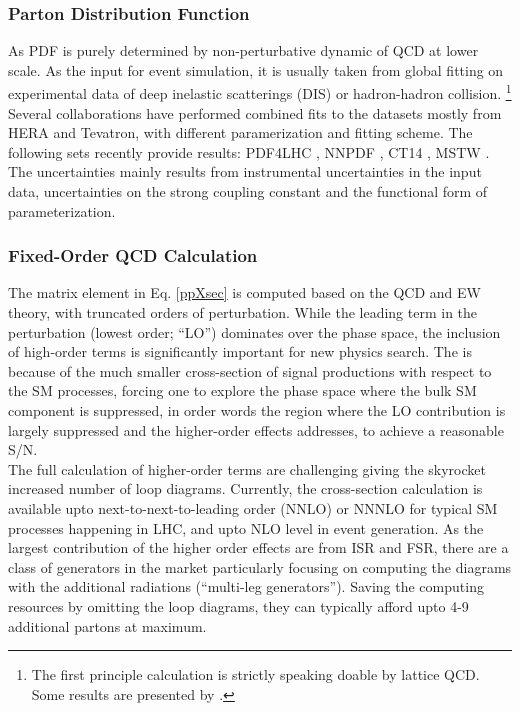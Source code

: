 


\subsubsection{Parton Distribution Function}
As PDF is purely determined by non-perturbative dynamic of QCD at lower scale.
As the input for event simulation, it is usually taken from global fitting on experimental data of deep inelastic scatterings (DIS) or hadron-hadron collision.
\footnote{The first principle calculation is strictly speaking doable by lattice QCD. Some results are presented by \cite{latticePDF}.}
Several collaborations have performed combined fits to the datasets mostly from HERA and Tevatron, with different paramerization and fitting scheme. 
The following sets recently provide results: PDF4LHC \cite{PDF4LHC}, NNPDF \cite{NNPDF}, CT14 \cite{CT14}, MSTW \cite{MSTW}.
The uncertainties mainly results from instrumental uncertainties in the input data, uncertainties on the strong coupling constant and the functional form of parameterization. 


\subsubsection{Fixed-Order QCD Calculation}
The matrix element in Eq. \ref{ppXsec} is computed based on the QCD and EW theory, with truncated orders of perturbation.
While the leading term in the perturbation (lowest order; ``LO'') dominates over the phase space, 
the inclusion of high-order terms is significantly important for new physics search.
The is because of the much smaller cross-section of signal productions with respect to the SM processes,
forcing one to explore the phase space where the bulk SM component is suppressed, 
in order words the region where the LO contribution is largely suppressed and the higher-order effects addresses,
to achieve a reasonable S/N. \\

The full calculation of higher-order terms are challenging giving the skyrocket increased number of loop diagrams.
Currently, the cross-section calculation is available upto next-to-next-to-leading order (NNLO) or NNNLO for typical SM processes happening in LHC, and upto NLO level in event generation. As the largest contribution of the higher order effects are from ISR and FSR, there are a class of generators in the market particularly focusing on computing the diagrams with the additional radiations (``multi-leg generators''). Saving the computing resources by omitting the loop diagrams, they can typically afford upto 4-9 additional partons at maximum. \\



